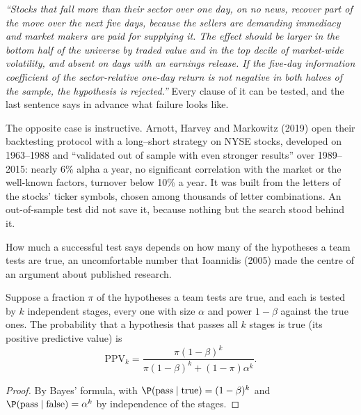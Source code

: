 \begin{example}\label{ex:rs:the-research-process:written}
\emph{``Stocks that fall more than their sector over one day, on no news, recover part of the move over the next five
days, because the sellers are demanding immediacy and market makers are paid for supplying it. The effect should be larger
in the bottom half of the universe by traded value and in the top decile of market-wide volatility, and absent on days with
an earnings release. If the five-day information coefficient of the sector-relative one-day return is not negative in both
halves of the sample, the hypothesis is rejected.''} Every clause of it can be tested, and the last sentence says in
advance what failure looks like.
\end{example}

The opposite case is instructive. Arnott, Harvey and Markowitz (2019) open their backtesting protocol with a long--short
strategy on NYSE stocks, developed on 1963--1988 and ``validated out of sample with even stronger results'' over
1989--2015: nearly 6\% alpha a year, no significant correlation with the market or the well-known factors, turnover below
10\% a year. It was built from the letters of the stocks' ticker symbols, chosen among thousands of letter combinations. An
out-of-sample test did not save it, because nothing but the search stood behind it.

How much a successful test says depends on how many of the hypotheses a team tests are true, an uncomfortable number that
Ioannidis (2005) made the centre of an argument about published research.

\begin{proposition}\label{prop:rs:the-research-process:ppv}
Suppose a fraction $\pi$ of the hypotheses a team tests are true, and each is tested by $k$ independent stages, every one with
size $\alpha$ and power $1 - \beta$ against the true ones. The probability that a hypothesis that passes all $k$ stages is true
(its positive predictive value) is
\[
\mathrm{PPV}_k = \frac{\pi(1 - \beta)^k}{\pi(1 - \beta)^k + (1 - \pi)\alpha^k}.
\]
\end{proposition}

\begin{proof}
By Bayes' formula, with $\P(\text{pass} \mid \text{true}) = (1 - \beta)^k$ and $\P(\text{pass} \mid \text{false}) = \alpha^k$ by
independence of the stages.
\end{proof}

